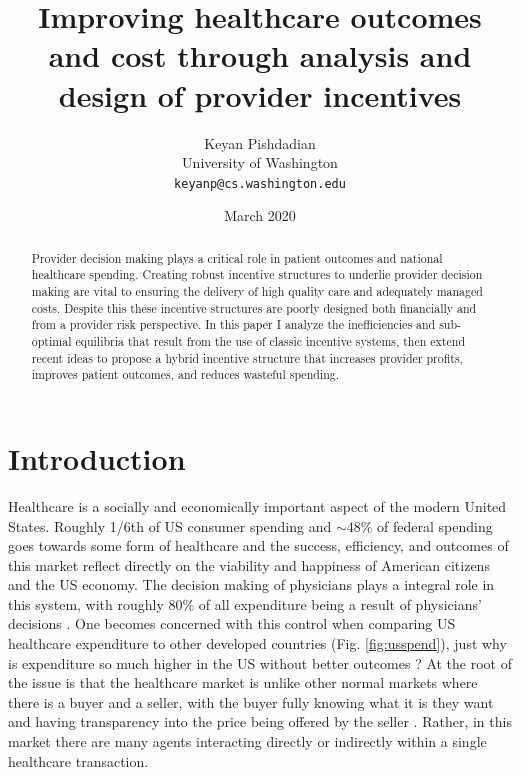 \documentclass{article}
\begin{document}
\title{Improving healthcare outcomes and cost through analysis and design of provider incentives}
\author{Keyan Pishdadian\\University of Washington\\\texttt{keyanp@cs.washington.edu}}
\date{March 2020}

\maketitle

\begin{abstract}
Provider decision making plays a critical role in patient outcomes and national healthcare spending. Creating robust incentive structures to underlie provider decision making are vital to ensuring the delivery of high quality care and adequately managed costs. Despite this these incentive structures are poorly designed both financially and from a provider risk perspective. In this paper I analyze the inefficiencies and sub-optimal equilibria that result from the use of classic incentive systems, then extend recent ideas to propose a hybrid incentive structure that increases provider profits, improves patient outcomes, and reduces wasteful spending.
\end{abstract}

\section{Introduction}
Healthcare is a socially and economically important aspect of the modern United States. Roughly 1/6th of US consumer spending \cite{econharvard} and ${\sim}48$\% of federal spending \cite{federalspend} goes towards some form of healthcare and the success, efficiency, and outcomes of this market reflect directly on the viability and happiness of American citizens and the US economy. The decision making of physicians plays a integral role in this system, with roughly 80\% of all expenditure being a result of physicians' decisions \cite{trust}. One becomes concerned with this control when comparing US healthcare expenditure to other developed countries (Fig. \ref{fig:usspend}), just why is expenditure so much higher in the US without better outcomes \cite{acoecon}? At the root of the issue is that the healthcare market is unlike other normal markets where there is a buyer and a seller, with the buyer fully knowing what it is they want and having transparency into the price being offered by the seller \cite{msdt}. Rather, in this market there are many agents interacting directly or indirectly within a single healthcare transaction.
\end{document}
